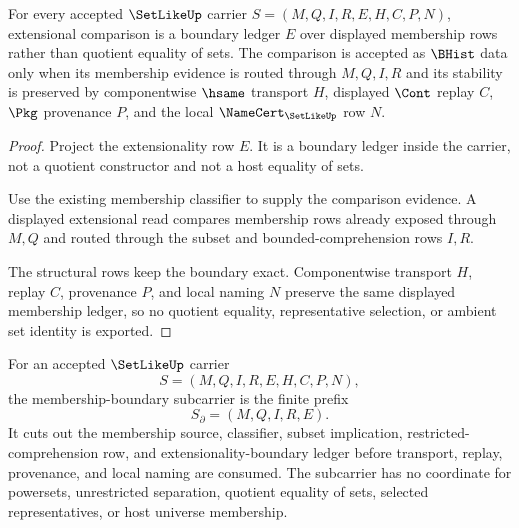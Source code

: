 \begin{theorem}
\label{thm:setlike-extensional-boundary-obligation}
For every accepted $\SetLikeUp$ carrier $S=(M,Q,I,R,E,H,C,P,N)$, extensional comparison is a boundary ledger $E$ over displayed membership rows rather than quotient equality of sets. The comparison is accepted as $\BHist$ data only when its membership evidence is routed through $M,Q,I,R$ and its stability is preserved by componentwise $\hsame$ transport $H$, displayed $\Cont$ replay $C$, $\Pkg$ provenance $P$, and the local $\NameCert_{\SetLikeUp}$ row $N$.
\end{theorem}
\begin{proof}
Project the extensionality row $E$. It is a boundary ledger inside the carrier, not a quotient constructor and not a host equality of sets.

Use the existing membership classifier to supply the comparison evidence. A displayed extensional read compares membership rows already exposed through $M,Q$ and routed through the subset and bounded-comprehension rows $I,R$.

The structural rows keep the boundary exact. Componentwise transport $H$, replay $C$, provenance $P$, and local naming $N$ preserve the same displayed membership ledger, so no quotient equality, representative selection, or ambient set identity is exported.
\end{proof}

\begin{definition}
\label{def:setlike-membership-boundary-subcarrier}
For an accepted $\SetLikeUp$ carrier
$$
S=(M,Q,I,R,E,H,C,P,N),
$$
the membership-boundary subcarrier is the finite prefix
$$
S_{\partial}=(M,Q,I,R,E).
$$
It cuts out the membership source, classifier, subset implication, restricted-comprehension row, and extensionality-boundary ledger before transport, replay, provenance, and local naming are consumed. The subcarrier has no coordinate for powersets, unrestricted separation, quotient equality of sets, selected representatives, or host universe membership.
\end{definition}

